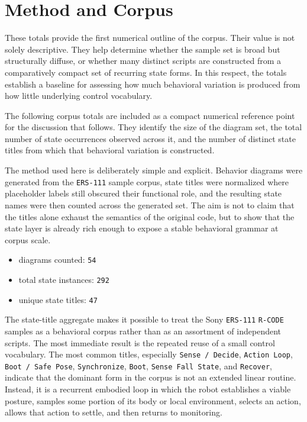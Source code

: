 \documentclass[11pt]{article}
\begin{document}
\section*{Method and Corpus}

These totals provide the first numerical outline of the corpus. Their
value is not solely descriptive. They help determine whether the sample
set is broad but structurally diffuse, or whether many distinct scripts
are constructed from a comparatively compact set of recurring state
forms. In this respect, the totals establish a baseline for assessing
how much behavioral variation is produced from how little underlying
control vocabulary.

The following corpus totals are included as a compact numerical
reference point for the discussion that follows. They identify the size
of the diagram set, the total number of state occurrences observed
across it, and the number of distinct state titles from which that
behavioral variation is constructed.

The method used here is deliberately simple and explicit. Behavior
diagrams were generated from the \texttt{ERS-111} sample corpus, state
titles were normalized where placeholder labels still obscured their
functional role, and the resulting state names were then counted
across the generated set. The aim is not to claim that the titles
alone exhaust the semantics of the original code, but to show that the
state layer is already rich enough to expose a stable behavioral
grammar at corpus scale.

\begin{itemize}
\item diagrams counted: \texttt{54}
\item total state instances: \texttt{292}
\item unique state titles: \texttt{47}
\end{itemize}

The state-title aggregate makes it possible to treat the Sony
\texttt{ERS-111} \texttt{R-CODE} samples as a behavioral corpus rather than
as an assortment of independent scripts. The most immediate result is
the repeated reuse of a small control vocabulary. The most common
titles, especially \texttt{Sense / Decide}, \texttt{Action Loop},
\texttt{Boot / Safe Pose}, \texttt{Synchronize}, \texttt{Boot},
\texttt{Sense Fall State}, and \texttt{Recover}, indicate that the
dominant form in the corpus is not an extended linear routine. Instead,
it is a recurrent embodied loop in which the robot establishes a viable
posture, samples some portion of its body or local environment,
selects an action, allows that action to settle, and then returns to
monitoring.
\end{document}
